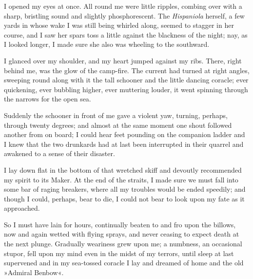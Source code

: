 I opened my eyes at once. All round me were little ripples, combing over with a sharp, bristling sound and slightly phosphorescent. The \textit{Hispaniola} herself, a few yards in whose wake I was still being whirled along, seemed to stagger in her course, and I saw her spars toss a little against the blackness of the night; nay, as I looked longer, I made sure she also was wheeling to the southward.

I glanced over my shoulder, and my heart jumped against my ribs. There, right behind me, was the glow of the camp-fire. The current had turned at right angles, sweeping round along with it the tall schooner and the little dancing coracle; ever quickening, ever bubbling higher, ever muttering louder, it went spinning through the narrows for the open sea.

Suddenly the schooner in front of me gave a violent yaw, turning, perhaps, through twenty degrees; and almost at the same moment one shout followed another from on board; I could hear feet pounding on the companion ladder and I knew that the two drunkards had at last been interrupted in their quarrel and awakened to a sense of their disaster.

I lay down flat in the bottom of that wretched skiff and devoutly recommended my spirit to its Maker. At the end of the straits, I made sure we must fall into some bar of raging breakers, where all my troubles would be ended speedily; and though I could, perhaps, bear to die, I could not bear to look upon my fate as it approached.

So I must have lain for hours, continually beaten to and fro upon the billows, now and again wetted with flying sprays, and never ceasing to expect death at the next plunge. Gradually weariness grew upon me; a numbness, an occasional stupor, fell upon my mind even in the midst of my terrors, until sleep at last supervened and in my sea-tossed coracle I lay and dreamed of home and the old »Admiral Benbow«.